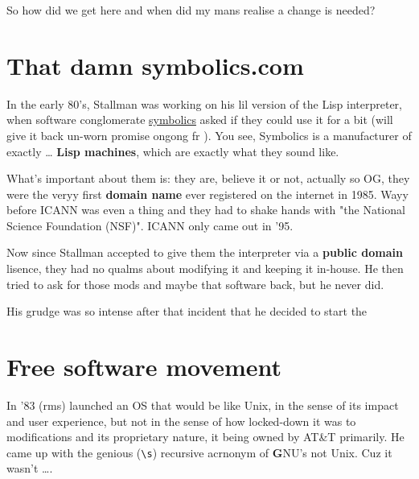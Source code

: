\documentclass[sigplan,screen]{acmart}
\begin{document}
So how did we get here and when did my mans realise a change is needed?

\section{That damn symbolics.com}
In the early 80's, Stallman was working on his lil version of the Lisp interpreter, when software conglomerate \href{https://symbolics.com}{symbolics} asked if they could use it for a bit (will give it back un-worn promise ongong fr ). You see, Symbolics is a manufacturer of exactly \ldots \textbf{ Lisp machines}, which are exactly what they sound like.

What's important about them is: they are, believe it or not, actually so OG, they were the veryy first \textbf{domain name} ever registered on the internet in 1985. Wayy before ICANN was even a thing and they had to shake hands with "the National Science Foundation (NSF)". ICANN only came out in '95. \cite{national-science-foundation}

Now since Stallman accepted to give them the interpreter via a \textbf{public domain} lisence, they had no qualms about modifying it and keeping it in-house. He then tried to ask for those mods and maybe that software back, but he never did.

His grudge was so intense after that incident that he decided to start the

\section{Free software movement}
In '83 (rms) launched an OS that would be like Unix, in the sense of its impact and user experience, but not in the sense of how locked-down it was to modifications and its proprietary nature, it being owned by AT\&T primarily. He came up with the genious (\verb|\s|) recursive acrnonym of \textbf{G}NU's not Unix. Cuz it wasn't \ldots.

\nocite{*}




\end{document}
